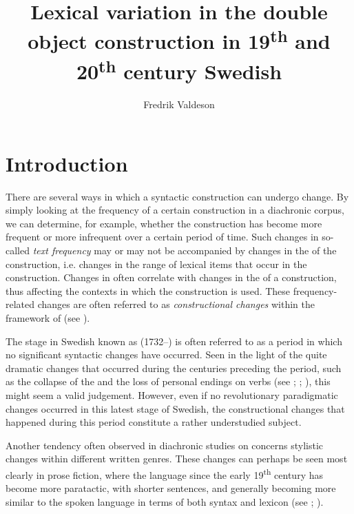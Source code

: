 \documentclass[output=paper]{langscibook}
\author{Fredrik Valdeson\affiliation{Stockholm University}}
\title[Lexical variation in double objects in 19\textsuperscript{th} and 20\textsuperscript{th} c. Swedish]
      {Lexical variation in the double object construction in 19\textsuperscript{th} and 20\textsuperscript{th} century Swedish}
\begin{document}
\maketitle 


\section{Introduction}\label{sec:valdeson:1}\largerpage


There are several ways in which a syntactic construction can undergo change. By simply looking at the frequency of a certain construction in a diachronic corpus, we can determine, for example, whether the construction has become more frequent or more infrequent over a certain period of time. Such changes in so-called \textit{text frequency} may or may not be accompanied by changes in the  of the construction, i.e. changes in the range of lexical items that occur in the construction. Changes in  often correlate with changes in the  of a construction, thus affecting the contexts in which the construction is used. These frequency-related changes are often referred to as \textit{constructional changes} within the framework of  (see \citealt{Hilpert2013}).



The stage in Swedish known as  (1732–) is often referred to as a period in which no significant syntactic changes have occurred. Seen in the light of the quite dramatic changes that occurred during the centuries preceding the  period, such as the collapse of the  and the loss of personal endings on verbs (see \citealt{Delsing2014Studier}; \citealt[1130--1132]{Mørck2005Nordic}; \citealt[1276]{Larsson2005}), this might seem a valid judgement. However, even if no revolutionary paradigmatic changes occurred in this latest stage of Swedish, the constructional changes that happened during this period constitute a rather understudied subject.



Another tendency often observed in diachronic studies on  concerns stylistic changes within different written genres. These changes can perhaps be seen most clearly in prose fiction, where the language since the early 19\textsuperscript{th} century has become more paratactic, with shorter sentences, and generally becoming more similar to the spoken language in terms of both syntax and lexicon (see \citealt{Johannisson1971}; \citealt[129–130]{Thelander2011}).
\end{document}
